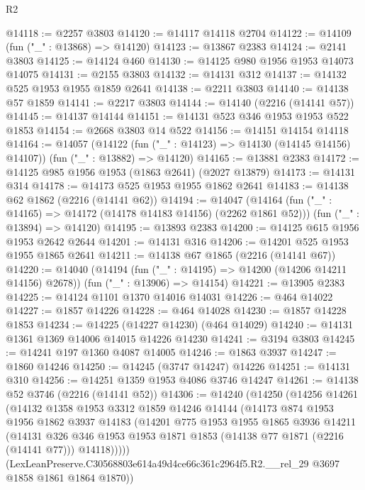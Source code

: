 \begin{lexlean}{R2}
\begin{coremodule}
@14118 := @2257 @3803
@14120 := @14117 @14118 @2704
@14122 := @14109 (fun ("_" : @13868) => @14120)
@14123 := @13867 @2383
@14124 := @2141 @3803
@14125 := @14124 @460
@14130 := @14125 @980 @1956 @1953 @14073 @14075
@14131 := @2155 @3803
@14132 := @14131 @312
@14137 := @14132 @525 @1953 @1955 @1859 @2641
@14138 := @2211 @3803
@14140 := @14138 @57 @1859
@14141 := @2217 @3803
@14144 := @14140 (@2216 (@14141 @57))
@14145 := @14137 @14144
@14151 := @14131 @523 @346 @1953 @1953 @522 @1853
@14154 := @2668 @3803 @14 @522
@14156 := @14151 @14154 @14118
@14164 := @14057
    (@14122 (fun ("_" : @14123) => @14130 (@14145 @14156) @14107))
    (fun ("_" : @13882) => @14120)
@14165 := @13881 @2383
@14172 := @14125 @985 @1956 @1953 (@1863 @2641) (@2027 @13879)
@14173 := @14131 @314
@14178 := @14173 @525 @1953 @1955 @1862 @2641
@14183 := @14138 @62 @1862 (@2216 (@14141 @62))
@14194 := @14047
    (@14164 (fun ("_" : @14165) => @14172 (@14178 @14183 @14156) (@2262 @1861 @52)))
    (fun ("_" : @13894) => @14120)
@14195 := @13893 @2383
@14200 := @14125 @615 @1956 @1953 @2642 @2644
@14201 := @14131 @316
@14206 := @14201 @525 @1953 @1955 @1865 @2641
@14211 := @14138 @67 @1865 (@2216 (@14141 @67))
@14220 := @14040
    (@14194 (fun ("_" : @14195) => @14200 (@14206 @14211 @14156) @2678))
    (fun ("_" : @13906) => @14154)
@14221 := @13905 @2383
@14225 := @14124 @1101 @1370 @14016 @14031
@14226 := @464 @14022
@14227 := @1857 @14226
@14228 := @464 @14028
@14230 := @1857 @14228 @1853
@14234 := @14225 (@14227 @14230) (@464 @14029)
@14240 := @14131 @1361 @1369 @14006 @14015 @14226 @14230
@14241 := @3194 @3803
@14245 := @14241 @197 @1360 @4087 @14005
@14246 := @1863 @3937
@14247 := @1860 @14246
@14250 := @14245 (@3747 @14247) @14226
@14251 := @14131 @310
@14256 := @14251 @1359 @1953 @4086 @3746 @14247
@14261 := @14138 @52 @3746 (@2216 (@14141 @52))
@14306 := @14240
    (@14250
      (@14256
        @14261
        (@14132
          @1358
          @1953
          @3312
          @1859
          @14246
          @14144
          (@14173
            @874
            @1953
            @1956
            @1862
            @3937
            @14183
            (@14201
              @775
              @1953
              @1955
              @1865
              @3936
              @14211
              (@14131
                @326
                @346
                @1953
                @1953
                @1871
                @1853
                (@14138 @77 @1871 (@2216 (@14141 @77)))
                @14118)))))
      (LexLeanPreserve.C30568803e614a49d4ce66c361c2964f5.R2.__rel_29 @3697 @1858 @1861 @1864 @1870))

\end{coremodule}
\end{lexlean}
